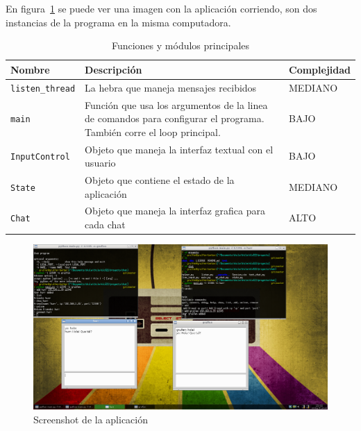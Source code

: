 \documentclass[a4paper, 12pt]{article}
\begin{document}
En figura~\ref{fig:screen} se puede ver una imagen con la aplicación corriendo,
son dos instancias de la programa en la misma computadora.
\begin{table}[h]
        \centering
        \begin{tabular}{|p{3cm}|p{8cm}|p{25mm}|}
                \hline
                \textbf{Nombre} & \textbf{Descripción} & \textbf{Complejidad} \\
                \hline
                \texttt{listen\_thread} & La hebra que maneja mensajes recibidos
                & MEDIANO \\
                \hline
                \texttt{main} & Función que usa los argumentos de la linea de
                comandos para configurar el programa. También corre el loop
                principal. & BAJO \\
                \hline
                \texttt{InputControl} & Objeto que maneja la interfaz textual
                con el usuario & BAJO \\
                \hline
                \texttt{State} & Objeto que contiene el estado de la aplicación & MEDIANO \\
                \hline
                \texttt{Chat} & Objeto que maneja la interfaz grafica para cada chat & ALTO \\
                \hline
        \end{tabular}
        \caption{Funciones y módulos principales}
        \label{tab:func}
\end{table}

\begin{figure}
        \centering
        \includegraphics[width=1.2\textwidth]{../imagenes/screenshot.png}
        \caption{Screenshot de la aplicación}
        \label{fig:screen}
\end{figure}
\end{document}
